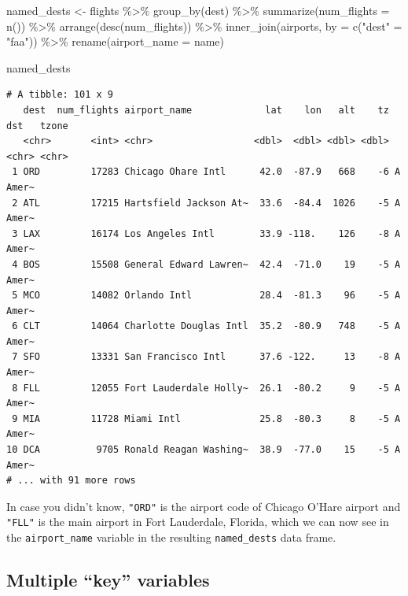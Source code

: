 \documentclass[
  letterpaper,
  DIV=11,
  numbers=noendperiod]{scrreprt}
\newenvironment{Shaded}{\begin{snugshade}}{\end{snugshade}}
\newcommand{\AttributeTok}[1]{\textcolor[rgb]{0.40,0.45,0.13}{#1}}
\newcommand{\FunctionTok}[1]{\textcolor[rgb]{0.28,0.35,0.67}{#1}}
\newcommand{\NormalTok}[1]{\textcolor[rgb]{0.00,0.23,0.31}{#1}}
\newcommand{\OtherTok}[1]{\textcolor[rgb]{0.00,0.23,0.31}{#1}}
\newcommand{\SpecialCharTok}[1]{\textcolor[rgb]{0.37,0.37,0.37}{#1}}
\newcommand{\StringTok}[1]{\textcolor[rgb]{0.13,0.47,0.30}{#1}}
\theoremstyle{definition}
\theoremstyle{remark}
\begin{document}
\begin{Shaded}
\begin{Highlighting}[]
\NormalTok{named\_dests }\OtherTok{\textless{}{-}}\NormalTok{ flights }\SpecialCharTok{\%\textgreater{}\%}
  \FunctionTok{group\_by}\NormalTok{(dest) }\SpecialCharTok{\%\textgreater{}\%}
  \FunctionTok{summarize}\NormalTok{(}\AttributeTok{num\_flights =} \FunctionTok{n}\NormalTok{()) }\SpecialCharTok{\%\textgreater{}\%}
  \FunctionTok{arrange}\NormalTok{(}\FunctionTok{desc}\NormalTok{(num\_flights)) }\SpecialCharTok{\%\textgreater{}\%}
  \FunctionTok{inner\_join}\NormalTok{(airports, }\AttributeTok{by =} \FunctionTok{c}\NormalTok{(}\StringTok{"dest"} \OtherTok{=} \StringTok{"faa"}\NormalTok{)) }\SpecialCharTok{\%\textgreater{}\%}
  \FunctionTok{rename}\NormalTok{(}\AttributeTok{airport\_name =}\NormalTok{ name)}

\NormalTok{named\_dests}
\end{Highlighting}
\end{Shaded}

\begin{verbatim}
# A tibble: 101 x 9
   dest  num_flights airport_name             lat    lon   alt    tz dst   tzone
   <chr>       <int> <chr>                  <dbl>  <dbl> <dbl> <dbl> <chr> <chr>
 1 ORD         17283 Chicago Ohare Intl      42.0  -87.9   668    -6 A     Amer~
 2 ATL         17215 Hartsfield Jackson At~  33.6  -84.4  1026    -5 A     Amer~
 3 LAX         16174 Los Angeles Intl        33.9 -118.    126    -8 A     Amer~
 4 BOS         15508 General Edward Lawren~  42.4  -71.0    19    -5 A     Amer~
 5 MCO         14082 Orlando Intl            28.4  -81.3    96    -5 A     Amer~
 6 CLT         14064 Charlotte Douglas Intl  35.2  -80.9   748    -5 A     Amer~
 7 SFO         13331 San Francisco Intl      37.6 -122.     13    -8 A     Amer~
 8 FLL         12055 Fort Lauderdale Holly~  26.1  -80.2     9    -5 A     Amer~
 9 MIA         11728 Miami Intl              25.8  -80.3     8    -5 A     Amer~
10 DCA          9705 Ronald Reagan Washing~  38.9  -77.0    15    -5 A     Amer~
# ... with 91 more rows
\end{verbatim}

In case you didn't know, \texttt{"ORD"} is the airport code of Chicago
O'Hare airport and \texttt{"FLL"} is the main airport in Fort
Lauderdale, Florida, which we can now see in the \texttt{airport\_name}
variable in the resulting \texttt{named\_dests} data frame.

\hypertarget{multiple-key-variables}{%
\subsection{Multiple ``key'' variables}\label{multiple-key-variables}}
\end{document}
